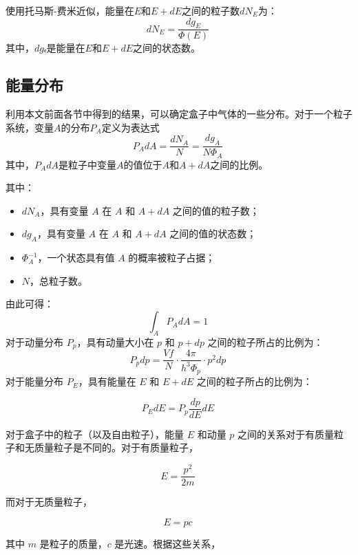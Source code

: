 使用托马斯-费米近似，能量在\(E\)和\(E+dE\)之间的粒子数\(dN_E\)为：
\[
dN_E = \frac{dg_E}{\Phi(E)}~
\]
其中，\(dg\)ₑ是能量在\(E\)和\(E+dE\)之间的状态数。
\subsection{能量分布}  
利用本文前面各节中得到的结果，可以确定盒子中气体的一些分布。对于一个粒子系统，变量\( A \)的分布\( P_A \)定义为表达式  
\[
P_A dA = \frac{dN_A}{N} = \frac{dg_A}{N \Phi_A}~
\]
其中，\( P_A dA \)是粒子中变量\( A \)的值位于\( A \)和\( A + dA \)之间的比例。

其中：
\begin{itemize}
\item \( dN_A \)，具有变量 \( A \) 在 \( A \) 和 \( A + dA \) 之间的值的粒子数；
\item \( dg_A \)，具有变量 \( A \) 在 \( A \) 和 \( A + dA \) 之间的值的状态数；
\item \( \Phi_A^{-1} \)，一个状态具有值 \( A \) 的概率被粒子占据；
\item \( N \)，总粒子数。
\end{itemize}
由此可得：
\[
\int_A P_A dA = 1~
\]
对于动量分布 \( P_p \)，具有动量大小在 \( p \) 和 \( p + dp \) 之间的粒子所占的比例为：
\[
P_p dp = \frac{Vf}{N} \cdot \frac{4\pi}{h^3 \Phi_p} \cdot p^2 dp~
\]
对于能量分布 \( P_E \)，具有能量在 \( E \) 和 \( E + dE \) 之间的粒子所占的比例为：

\[
P_E dE = P_p \frac{dp}{dE} dE~
\]

对于盒子中的粒子（以及自由粒子），能量 \( E \) 和动量 \( p \) 之间的关系对于有质量粒子和无质量粒子是不同的。对于有质量粒子，

\[
E = \frac{p^2}{2m}~
\]

而对于无质量粒子，

\[
E = pc~
\]

其中 \( m \) 是粒子的质量，\( c \) 是光速。根据这些关系，